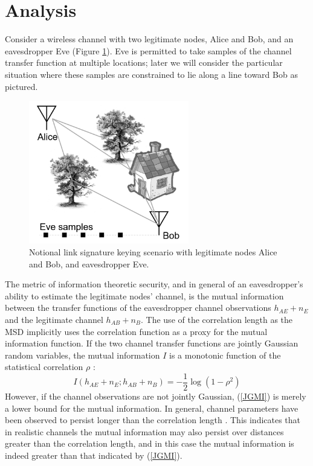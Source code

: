 \documentclass[journal]{ieeetran}
\begin{document}
\section{Analysis}
Consider a wireless channel with two legitimate nodes, Alice and Bob, and an eavesdropper Eve (Figure \ref{scenario}).  Eve is permitted to take samples of the channel transfer function at multiple locations; later we will consider the particular situation where these samples are constrained to lie along a line toward Bob as pictured.
\begin{figure}
\begin{center}
\includegraphics[width=2.75in]{scenario}
\caption{Notional link signature keying scenario with legitimate nodes Alice and Bob, and eavesdropper Eve.}\label{scenario}
\end{center}
\end{figure}

The metric of information theoretic security, and in general of an eavesdropper's ability to estimate the legitimate nodes' channel, is the mutual information between the transfer functions of the eavesdropper channel observations $h_{AE}+n_E$ and the legitimate channel $h_{AB}+n_B$. The use of the correlation length as the MSD implicitly uses the correlation function as a proxy for the mutual information function.  If the two channel transfer functions are jointly Gaussian random variables, the mutual information $I$ is a monotonic function of the statistical correlation $\rho$ \cite{cover2006-jgvars}:
\begin{equation}\label{JGMI}
I(h_{AE}+n_E;h_{AB}+n_B) = -\frac{1}{2}\log (1-\rho^2)
\end{equation}
However, if the channel observations are not jointly Gaussian, (\ref{JGMI}) is merely a lower bound for the mutual information.  In general, channel parameters have been observed to persist longer than the correlation length \cite{jakes1974, duel-hallen2007}.  This indicates that in realistic channels the mutual information may also persist over distances greater than the correlation length, and in this case the mutual information is indeed greater than that indicated by (\ref{JGMI}).
\end{document}
